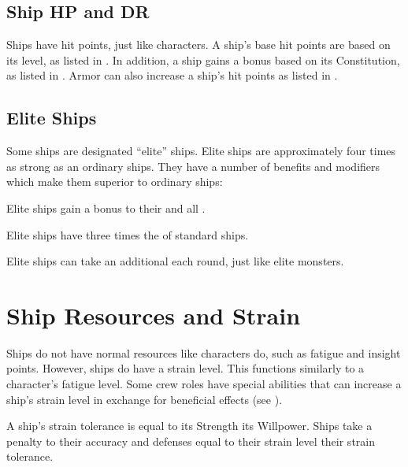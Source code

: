   \subsection{Ship HP and DR}
    Ships have hit points, just like characters.
    A ship's base hit points are based on its level, as listed in .
    In addition, a ship gains a bonus based on its Constitution, as listed in .
    Armor can also increase a ship's hit points as listed in .

  \subsection{Elite Ships}\label{Elite Ships}
    Some ships are designated ``elite'' ships.
    Elite ships are approximately four times as strong as an ordinary ships.
    They have a number of benefits and modifiers which make them superior to ordinary ships:
    \begin{raggeditemize}
      \item Elite ships gain a  bonus to their  and all .
      \item Elite ships have three times the  of standard ships.
      \item Elite ships can take an additional  each round, just like elite monsters.
    \end{raggeditemize}

\section{Ship Resources and Strain}
  Ships do not have normal resources like characters do, such as fatigue and insight points.
  However, ships do have a strain level.
  This functions similarly to a character's fatigue level.
  Some crew roles have special abilities that can increase a ship's strain level in exchange for beneficial effects (see ).

  A ship's strain tolerance is equal to its Strength \add its Willpower.
  Ships take a penalty to their accuracy and defenses equal to their strain level \sub their strain tolerance.

